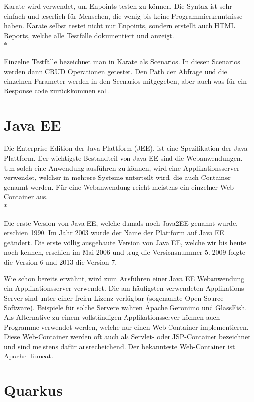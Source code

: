 Karate wird verwendet, um Enpoints testen zu können. Die Syntax ist sehr einfach und leserlich für Menschen, die wenig bis keine Programmierkenntnisse haben.
Karate selbst testet nicht nur Enpoints, sondern erstellt auch HTML Reports, welche alle Testfälle dokumentiert und anzeigt. \\*

Einzelne Testfälle bezeichnet man in Karate als Scenarios. In diesen Scenarios werden dann CRUD Operationen getestet. Den Path der Abfrage und die einzelnen 
Parameter werden in den Scenarios mitgegeben, aber auch was für ein Response code zurückkommen soll.



\section{Java EE}
\author{David Ignjatovic} 

Die Enterprise Edition der Java Plattform (JEE), ist eine Spezifikation der Java-Plattform. 
Der wichtigste Bestandteil von Java EE sind die Webanwendungen. Um solch eine Anwendung ausführen zu können, wird eine Applikationsserver verwendet, welcher 
in mehrere Systeme unterteilt wird, die auch Container genannt werden. Für eine Webanwendung reicht meistens ein einzelner Web-Container aus. \\*

Die erste Version von Java EE, welche damals noch Java2EE genannt wurde, erschien 1990. Im Jahr 2003 wurde der Name der Plattform auf Java EE geändert.
Die erste völlig ausgebaute Version von Java EE, welche wir bis heute noch kennen, erschien im Mai 2006 und trug die Versionsnummer 5. 
2009 folgte die Version 6 und 2013 die Version 7.

Wie schon bereits erwähnt, wird zum Ausführen einer Java EE Webanwendung ein Applikationsserver verwendet. 
Die am häufigsten verwendeten Applikations-Server sind unter einer freien Lizenz verfügbar (sogenannte Open-Source-Software).
Beispiele für solche Servere währen Apache Geronimo und GlassFish. 
Als Alternative zu einem vollständigen Applikationsserver können auch Programme verwendet werden, welche nur einen Web-Container implementieren.
Diese Web-Container werden oft auch als Servlet- oder JSP-Container bezeichnet und sind meistens dafür ausrecheichend. Der bekannteste Web-Container ist Apache Tomcat.

\cite{JavaEE}

\section{Quarkus}
\author{David Ignjatovic} 

